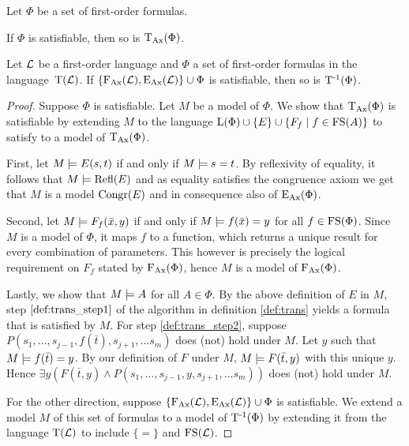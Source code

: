 \begin{prop}
	\label{prop:trans_sat_equiv}
	Let $\Phi$ be a set of first-order formulas.
	\begin{compactenum}
		\item If $\Phi$ is satisfiable, then so is $\operatorname{\operatorname{T}_{Ax}}(\Phi)$.
			\label{prop:trans_sat_equiv1}
		\item Let $\operatorname{\mathcal{L}}$ be a first-order language and $\Phi$ a set of first-order formulas in the language~$\operatorname{T}(\operatorname{\mathcal{L}})$.
			If $\{\operatorname{F_{Ax}}(\operatorname{\mathcal{L}}), \operatorname{E_{Ax}}(\operatorname{\mathcal{L}})\} \cup \Phi $ is satisfiable, then so is $\operatorname{T^{-1}}(\Phi)$.
			\label{prop:trans_sat_equiv2}
	\end{compactenum}
\end{prop}
\begin{proof}
	Suppose $\Phi$ is satisfiable.
	Let $M$ be a model of $\Phi$.
	We show that $\operatorname{\operatorname{T}_{Ax}}(\Phi)$ is satisfiable by extending $M$ to the language $\operatorname{L}(\Phi)\cup\{E\}\cup\{F_f\mid f \in \operatorname{FS}(A)\}$ to satisfy to a model of $\operatorname{\operatorname{T}_{Ax}}(\Phi)$.

	First, let $M \models E(s, t)$ if and only if $M \models s = t$.
	By reflexivity of equality, it follows that $M \models \operatorname{Refl}(E)$ and
	as equality satisfies the congruence axiom we get that $M$ is a model $\operatorname{Congr}(E)$ and in consequence also of $\operatorname{E_{Ax}}(\Phi)$.

	Second, let $M \models F_f(\bar x, y)$ if and only if $M \models f(\bar x) = y$ for all $f \in \operatorname{FS}(\Phi)$. 
	Since $M$ is a model of $\Phi$, it maps $f$ to a function, which returns a unique result for every combination of parameters.
	This however is precisely the logical requirement on $F_f$ stated by $\operatorname{F_{Ax}}(\Phi)$,   
	hence $M$ is a model of $\operatorname{F_{Ax}}(\Phi)$.

	Lastly, we show that $M \models A$ for all $A \in \Phi$.
	By the above definition of $E$ in $M$, step $\ref{def:trans_step1}$ of the algorithm in definition \ref{def:trans} yields a formula that is satisfied by $M$.
	For step \ref{def:trans_step2}, suppose $P(s_1, \ldots, s_{j-1}, f(\bar t),\allowbreak s_{j+1}, \ldots s_m)$ does (not) hold under $M$.
	Let $y$ such that $M \models f(\bar t)=y$.
	By our definition of $F$ under $M$, $M\models F(\bar t, y)$ with this unique $y$.
	Hence $\exists y (F(\bar t, y) \land P(s_1, \ldots, s_{j-1}, y, \allowbreak s_{j+1}, \ldots s_m))$ does (not) hold under $M$.


	For the other direction, suppose $\{\operatorname{F_{Ax}}(\operatorname{\mathcal{L}}), \operatorname{E_{Ax}}(\operatorname{\mathcal{L}})\} \cup \Phi$ is satisfiable.
	We extend a model $M$ of this set of formulas to a model of $\operatorname{T^{-1}}(\Phi)$ by extending it from the language $\operatorname{T}(\operatorname{\mathcal{L}})$ to include $\{=\}$ and $\operatorname{FS}(\operatorname{\mathcal{L}})$.


\end{proof}
